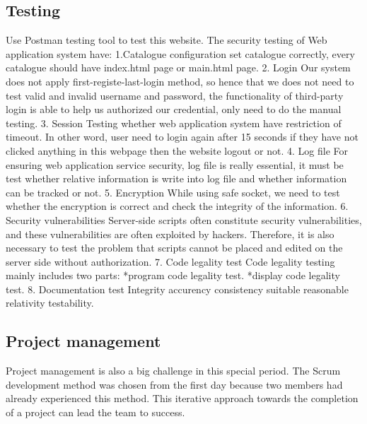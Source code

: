 \documentclass[conference]{IEEEtran}
\begin{document}
\subsection{Testing}
Use Postman testing tool to test this website. The security testing of Web application system have:
1.Catalogue configuration
set catalogue correctly, every catalogue should have index.html page or main.html page.
2. Login
Our system does not apply first-registe-last-login method, so hence that we does not need to test
valid and invalid username and password, the functionality of third-party login is able to help
us authorized our credential, only need to do the manual testing.
3. Session
Testing whether web application system have restriction of timeout. In other word, user need to
login again after 15 seconds if they have not clicked anything in this webpage then the website
logout or not.
4. Log file
For ensuring web application service security, log file is really essential, it must be test whether
relative information is write into log file and whether information can be tracked or not.
5. Encryption
While using safe socket, we need to test whether the encryption is correct and check the integrity
of the information.
6. Security vulnerabilities
Server-side scripts often constitute security vulnerabilities, and these vulnerabilities are often exploited by hackers.
Therefore, it is also necessary to test the problem that scripts cannot be placed and edited on the server side without authorization.
7. Code legality test
Code legality testing mainly includes two parts:
*program code legality test.
*display code legality test.
8. Documentation test
Integrity accurency consistency suitable reasonable relativity testability.

\subsection{Project management}

Project management is also a big challenge in this special period. The Scrum development method was chosen from the first day because two members
had already experienced this method. This iterative approach towards the completion of a project can lead the team to success.
\end{document}
